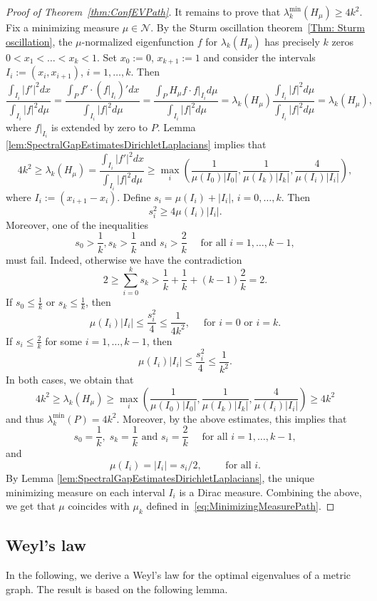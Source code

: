 \documentclass[reqno]{amsart}
\theoremstyle{plain}
\theoremstyle{definition}
\theoremstyle{remark}
\numberwithin{equation}{section}
\newcommand{\cN}{\mathcal{N}}
\begin{document}
\begin{proof}[Proof of Theorem~\ref{thm:ConfEVPath}]
	
	It remains to prove that $\lambda_k^{\min}(H_\mu)  \ge 4k^2$. Fix a minimizing measure $\mu \in \cN$. By the Sturm oscillation theorem~\ref{Thm: Sturm oscillation}, the $\mu$-normalized eigenfunction $f$ for  $\lambda_k(H_\mu)$ has precisely $k$ zeros $0<x_1<\dots < x_k <1$. Set $x_0 :=0$, $x_{k+1} :=1$ and consider the intervals $I_i:=(x_i, x_{i+1})$, $i= 1 , \dots, k$. Then 
	\[
	\frac{\int_{I_i} |f'|^2 dx }{\int_{I_{i}} |f|^2d\mu} = \frac{\int_{P} f' \cdot (f|_{I_i})' dx }{\int_{I_{i}} |f|^2d\mu} = \frac{\int_{P} H_{\mu}f \cdot f|_{I_i} d\mu }{\int_{I_{i}} |f|^2d\mu} = \lambda_k(H_\mu) \frac{\int_{I_i} |f|^2 d\mu }{\int_{I_{i}} |f|^2d\mu} = \lambda_k(H_\mu), 
	\] where $f|_{I_i}$ is extended by zero to $P$. Lemma \ref{lem:SpectralGapEstimatesDirichletLaplacians} implies that
	\[
	4k^2 \ge \lambda_k(H_\mu) = \frac{\int_{I_i} |f'|^2 dx }{\int_{I_{i}} |f|^2d\mu} \geq \max_i \left(\frac{1}{\mu(I_0)|I_0|},\frac{1}{\mu(I_k)|I_k|}  ,\frac{4}{\mu(I_i)|I_i|} \right),
	\]
	where $I_i := (x_{i+1}-x_i)$. Define $s_i = \mu(I_i)+|I_i|$, $i=0, \dots, k$. Then
	\[
	s_i^2 \ge 4 \mu(I_i) |I_i|.
	\]
	Moreover, one of the inequalities
	\[
	s_0 > \frac{1}{k}, s_k > \frac{1}{k} \text{ and } s_i > \frac{2}{k} \quad \text{ for all } i=1, \dots, k-1,
	\]
	must fail. Indeed, otherwise we have the contradiction
	\[
	2  \ge \sum_{i=0}^{k} s_k > \frac{1}{k} + \frac{1}{k} + (k-1) \frac{2}{k} = 2.
	\]
	If $s_0 \leq \frac{1}{k}$ or $s_k \leq \frac{1}{k}$, then
	\[
	\mu(I_i)|I_i| \leq \frac{s_i^2}{4} \leq \frac{1}{4 k^2}, \quad \text{ for } i=0 \text{ or } i=k.
	\]
	If $s_i \leq \frac{2}{k}$ for some $i=1, \dots, k-1$, then
	\[
	\mu(I_i)|I_i|	 \leq \frac{s_i^2}{4} \leq \frac{1}{k^2}.
	\]
	In both cases, we obtain that
	\[
	4k^2 \ge \lambda_k(H_\mu) \ge \max_i \left(\frac{1}{\mu(I_0)|I_0|},\frac{1}{\mu(I_k)|I_k|}  ,\frac{4}{\mu(I_i)|I_i|} \right) \geq 4k^2 
	\] and thus $\lambda_k^{\min}(P)=4k^2$. Moreover, by the above estimates, this implies that
	\[
	s_0 = \frac{1}{k},\; s_k = \frac{1}{k} \text{ and } s_i = \frac{2}{k} \quad \text{ for all } i=1, \dots, k-1, 
	\] and 
	\[
	\mu(I_i) = |I_i| = s_i /2, \qquad \text{ for all } i.
	\]
	By Lemma \ref{lem:SpectralGapEstimatesDirichletLaplacians}, the unique minimizing measure on each interval $I_i$ is a Dirac measure. Combining the above, we get that $\mu$ coincides with $\mu_k$ defined in~\eqref{eq:MinimizingMeasurePath}.
\end{proof}


\subsection{Weyl's law}
In the following, we derive a Weyl's law for the optimal eigenvalues of a metric graph. The result is based on the following lemma.
\end{document}

